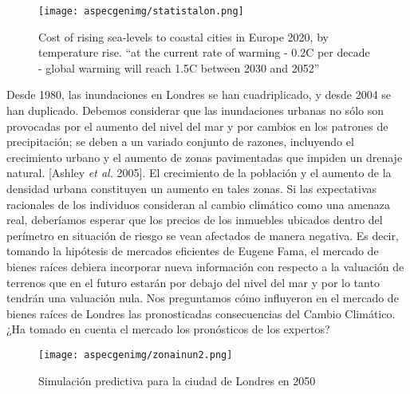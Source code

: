 \documentclass[12pt]{article}
\begin{document}
\begin{figure}[H]
\centering
\texttt{[image: aspecgenimg/statistalon.png]}
\caption*{Cost of rising sea-levels to coastal cities in Europe 2020, by temperature rise.
“at the current rate of warming - 0.2C per decade - global warming
will reach 1.5C between 2030 and 2052” \footnotemark}
\end{figure}
Desde 1980, las inundaciones en Londres se han cuadriplicado, y desde 2004 se han duplicado\footnotemark.
Debemos considerar que las inundaciones urbanas no sólo son provocadas por el aumento del nivel del mar y por cambios en los patrones de precipitación; se deben a un variado conjunto de razones, incluyendo el crecimiento urbano y el aumento de zonas pavimentadas que impiden un drenaje natural. [Ashley \textit{et al.} 2005]\footnotemark.  El crecimiento de la población y el aumento de la densidad urbana constituyen un aumento en tales zonas. Si las expectativas racionales de los individuos consideran al cambio climático como una amenaza real, deberíamos esperar que los precios de los inmuebles ubicados dentro del perímetro en situación de riesgo se vean afectados de manera negativa. Es decir, tomando la hipótesis de mercados eficientes de Eugene Fama, el mercado de bienes raíces debiera incorporar nueva información con respecto a la valuación de terrenos que en el futuro estarán por debajo del nivel del mar y por lo tanto tendrán una valuación nula. Nos preguntamos cómo influyeron en el mercado de bienes raíces de Londres las pronosticadas consecuencias del Cambio Climático. ¿Ha tomado en cuenta el mercado los pronósticos de los expertos? 


\begin{figure}[H]
\centering
\texttt{[image: aspecgenimg/zonainun2.png]}
\caption*{Simulación predictiva para la ciudad de Londres en 2050\footnotemark}
\end{figure}
\end{document}
